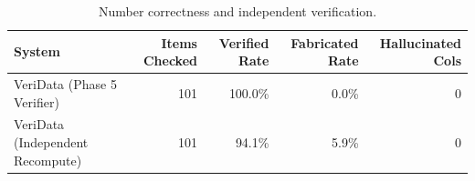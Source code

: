 \begin{table}[htbp]
\centering
\caption{Number correctness and independent verification.}
\label{tab:table_e4_numbers}
\begin{tabular}{lrrrr}
\toprule
System & Items Checked & Verified Rate & Fabricated Rate & Hallucinated Cols \\
\midrule
VeriData (Phase 5 Verifier) & 101 & 100.0\% & 0.0\% & 0 \\
VeriData (Independent Recompute) & 101 & 94.1\% & 5.9\% & 0 \\
\bottomrule
\end{tabular}
\end{table}

